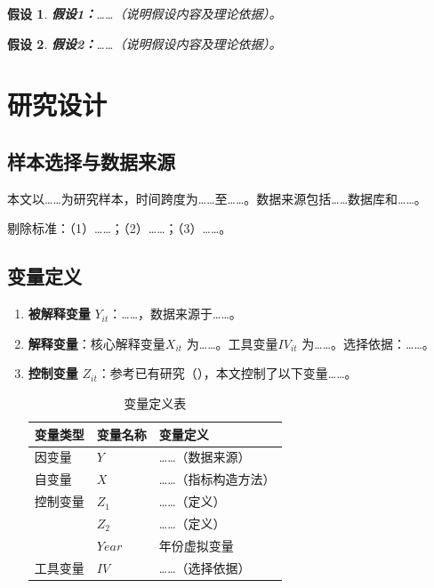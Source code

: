 \documentclass[10pt, UTF8, twocolumn]{ctexart}
\newcommand{\xiaosi}{\fontsize{12pt}{18pt}\selectfont}
\newtheorem{hypothesis}{假设}
\begin{document}
\begin{hypothesis}
\label{hyp:h1}
\textbf{假设1：}……（说明假设内容及理论依据）。
\end{hypothesis}

\begin{hypothesis}
\label{hyp:h2}
\textbf{假设2：}……（说明假设内容及理论依据）。
\end{hypothesis}

\section{研究设计}
\label{sec:design}

\subsection{样本选择与数据来源}
本文以……为研究样本，时间跨度为……至……。数据来源包括……数据库和……。

剔除标准：（1）……；（2）……；（3）……。

\subsection{变量定义}

\begin{enumerate}
\itemsep0pt
\item \textbf{被解释变量} $Y_{it}$：……，数据来源于……。

\item \textbf{解释变量}：核心解释变量$X_{it}$ 为……。工具变量$IV_{it}$ 为……。选择依据：……。

\item \textbf{控制变量} $Z_{it}$：参考已有研究（\cite{xxx}），本文控制了以下变量……。

\begin{table}[htbp]
\centering
\caption{变量定义表}
\label{tab:var}
\xiaosi
\begin{tabular}{p{2cm}p{2.5cm}p{5.5cm}}
\toprule
变量类型 & 变量名称 & 变量定义 \\
\midrule
因变量 & $Y$ & ……（数据来源）\\
\midrule
自变量 & $X$ & ……（指标构造方法）\\
\midrule
控制变量 & $Z_1$ & ……（定义）\\
& $Z_2$ & ……（定义）\\
& $Year$ & 年份虚拟变量\\
\midrule
工具变量 & $IV$ & ……（选择依据）\\
\bottomrule
\end{tabular}
\end{table}
\end{enumerate}
\end{document}
